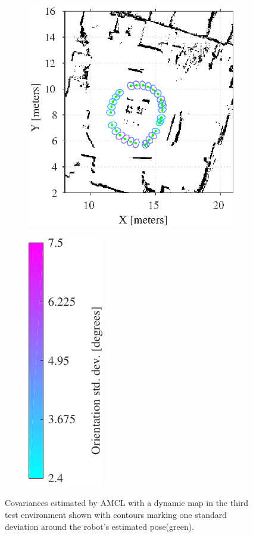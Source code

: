 \begin{figure}[htbp]
	\centering
	\begin{subfigure}[t]{0.55\textwidth}
		\includegraphics[scale=1.0]{chapters/evaluation/figures/localization_dynamic_map3}		
	\end{subfigure}
	\begin{subfigure}[t]{0.2\textwidth}
		\includegraphics[scale=1.0]{chapters/evaluation/figures/localization_std_color_bar-crop}
	\end{subfigure}
	
	\caption{Covariances estimated by AMCL with a dynamic map in the third test environment shown with contours marking one standard deviation around the robot's estimated pose(green).}
    \label{fig:amcl_covariance_dynamic3}
\end{figure}